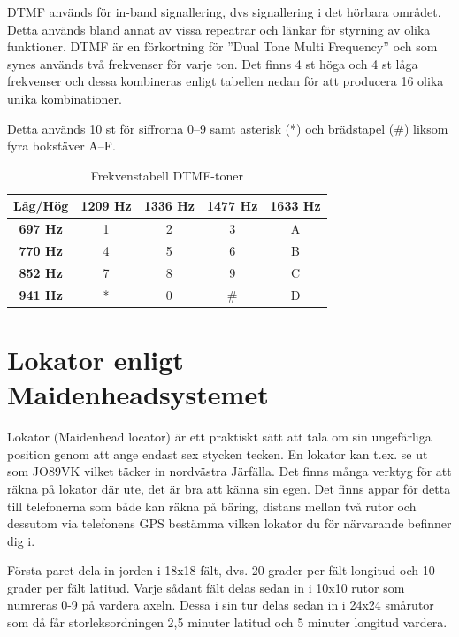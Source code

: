 \label{DTMF}

DTMF används för in-band signallering, dvs signallering i det hörbara området.
Detta används bland annat av vissa repeatrar och länkar för styrning av olika
funktioner. DTMF är en förkortning för ''Dual Tone Multi Frequency'' och som
synes används två frekvenser för varje ton. Det finns 4 st höga och 4 st låga
frekvenser och dessa kombineras enligt tabellen nedan för att producera 16 olika
unika kombinationer.

Detta används 10 st för siffrorna 0--9 samt asterisk (*) och brädstapel (\#)
liksom fyra bokstäver A--F.

\begin{table}[H]
\centering
\begin{tabular}{c|cccc}
	\textbf{Låg/Hög} & \textbf{1209 Hz} & \textbf{1336 Hz} & \textbf{1477 Hz} & \textbf{1633 Hz} \\ \hline
	\textbf{697 Hz}  &        1         &        2         &        3         &        A         \\
	\textbf{770 Hz}  &        4         &        5         &        6         &        B         \\
	\textbf{852 Hz}  &        7         &        8         &        9         &        C         \\
	\textbf{941 Hz}  &        *         &        0         &        \#        &        D
\end{tabular}
\caption{Frekvenstabell DTMF-toner}
\end{table}


\section{Lokator enligt Maidenheadsystemet}
\label{sec:lokator}

Lokator (Maidenhead locator) är ett praktiskt sätt att tala om sin ungefärliga
position genom att ange endast sex stycken tecken. En lokator kan t.ex. se ut
som JO89VK vilket täcker in nordvästra Järfälla. Det finns många verktyg för
att räkna på lokator där ute, det är bra att känna sin egen. Det finns appar
för detta till telefonerna som både kan räkna på bäring, distans mellan två
rutor och dessutom via telefonens GPS bestämma vilken lokator du för
närvarande befinner dig i.

Första paret dela in jorden i 18x18 fält, dvs. 20 grader per fält longitud och
10 grader per fält latitud. Varje sådant fält delas sedan in i 10x10 rutor som
numreras 0-9 på vardera axeln. Dessa i sin tur delas sedan in i 24x24 smårutor
som då får storleksordningen 2,5 minuter latitud och 5 minuter longitud vardera.


